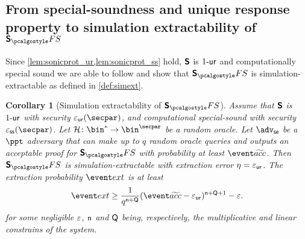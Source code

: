 \let\accentvec\vec \documentclass[runningheads,10pt]{llncs}
\newtheorem{corollary}[theorem]{Corollary} \theoremstyle{definition}
\begin{document}
\subsection{From special-soundness and unique response property to simulation extractability of $\sonicprotfs$}
Since \cref{lem:sonicprot_ur,lem:sonicprot_ss} hold, $\bm{\mathsf{S}}$ is ${1\text{-}\mathsf{ur}}$ and computationally special sound we are able to follow \cite{INDOCRYPT:FKMV12} and show that $\sonicprotfs$ is simulation-extractable as defined in \cref{def:simext}.

\begin{corollary}[Simulation extractability of $\sonicprotfs$]
	\label{thm:sonicprotfs_se}
	Assume that  $\bm{\mathsf{S}}$ is ${1\text{-}\mathsf{ur}}$ with security $\epsur(\secpar)$, and
	computational special-sound with security $\epsss(\secpar)$.  Let $\ro\colon
	\bin^* \to \bin^\secpar$ be a random oracle. 
	Let $\advse$ be a $\ppt$ adversary that can make up to $q$ random oracle
	queries and outputs an acceptable proof for $\sonicprotfs$ with probability
	at least $\waccProb$.  Then $\sonicprotfs$ is simulation-extractable with
	extraction error $\eta = \varepsilon_{\mathsf{ur}}$. The extraction probability $\extProb$ is at least
	\[
			\extProb  \geq \frac{1}{q^{\multconstr + \linconstr}} (\waccProb - \epsur)^{\multconstr +
			\linconstr + 1} - \eps.
	\]
	for some negligible $\varepsilon$, $\mathsf{n}$ and $\mathsf{Q}$ being,
	respectively, the multiplicative and linear constrains of the system.
\end{corollary}




\appendix
\end{document}
